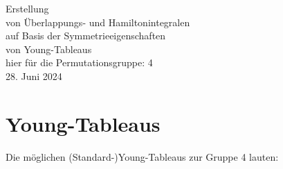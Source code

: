 \documentclass[fleqn]{article}%
\begin{document}
%
\normalsize%
\noindent%
\thispagestyle{empty}%
\begin{center}%
\vspace*{4cm}%
\Huge{}%
Erstellung %
\\ %
 von Überlappungs{-} und Hamiltonintegralen %
\\ %
 auf Basis der Symmetrieeigenschaften %
\\ %
 von Young{-}Tableaus%
\\ %
\vspace{1cm}%
\Large{hier für die Permutationsgruppe: 4}%
\\ %
\vspace{4cm}%
\Large{28. Juni 2024}%
\end{center}%
\newpage%
\setcounter{page}{1}%
\pagestyle{fancy}%
\fancyhf{}%
%
\fancyhead[R]{\nouppercase{\leftmark}}%
\renewcommand{\footrulewidth}{0.4pt}%
\fancyfoot[C]{\thepage}%
\section{Young{-}Tableaus}%
\label{sec:Young{-}Tableaus}%
Die möglichen (Standard-)Young-Tableaus zur Gruppe 4 lauten:
\end{document}
